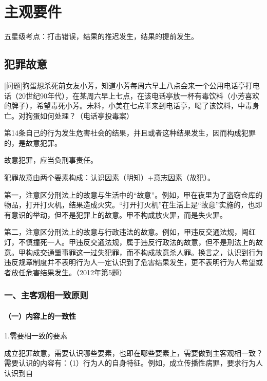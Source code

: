 \chapter{主观要件}

\begin{EditionOpeningPanel}
五星级考点：打击错误，结果的推迟发生，结果的提前发生。
\end{EditionOpeningPanel}

\section{犯罪故意}

[问题]狗蛋想杀死前女友小芳，知道小芳每周六早上八点会来一个公用电话亭打电话（20世纪90年代），在某周六早上七点，在该电话亭放一杯有毒饮料（小芳喜欢的牌子），希望毒死小芳。未料，小美在七点半来到电话亭，喝了该饮料，中毒身亡。对狗蛋如何处理？（电话亭投毒案）

第14条自己的行为发生危害社会的结果，并且或者这种结果发生，因而构成犯罪的，是故意犯罪。

故意犯罪，应当负刑事责任。

犯罪故意由两个要素构成：认识因素（明知）+意志因素（故犯）。

第一，注意区分刑法上的故意与生活中的“故意”。例如，甲在夜里为了盗窃仓库的物品，打开打火机，结果造成火灾。“打开打火机”在生活上是“故意”实施的，也即有意识的举动，但不是犯罪上的故意。甲不构成放火罪，而是失火罪。

第二，注意区分刑法上的故意与行政违法的故意。例如，甲违反交通法规，闯红灯，不慎撞死一人。甲违反交通法规，属于违反行政法的故意，但不是刑法上的故意。甲构成交通肇事罪这一过失犯罪，而不构成故意杀人罪。换言之，认识到行为违反规章制度并不表明行为人一定认识到了危害结果发生，更不表明行为人希望或者放任危害结果发生。（2012年第5题）

\subsection*{一、主客观相一致原则}

\subsubsection*{（一）内容上的一致性}

1.需要相一致的要素

成立犯罪故意，需要认识哪些要素，也即在哪些要素上，需要做到主客观相一致？需要认识的内容有：（1）行为人的自身特征。例如，成立传播性病罪，要求行为人认识到自

